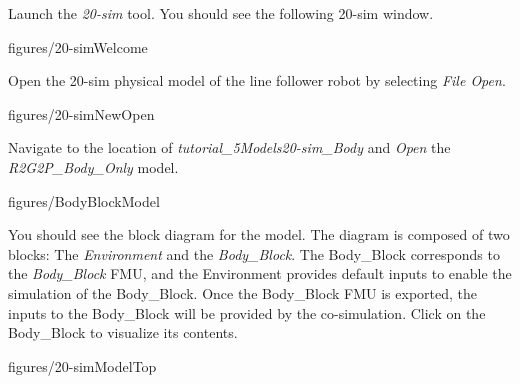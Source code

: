 \documentclass[11pt,a4paper]{../tutorial}
\begin{document}
\begin{instructions}

\item \label{step:exp3} Launch the \emph{20-sim} tool. You should see the following 20-sim window.

    \begin{annotation}[width=0.85\linewidth]{figures/20-simWelcome}
    \end{annotation}


\item Open the 20-sim physical model of the line follower robot by selecting \emph{File \menusep Open}.

     \begin{annotation}[width=0.8\linewidth, trim={0 12cm 0 0},clip]{figures/20-simNewOpen}
    \end{annotation}



\item \label{step:exp4} Navigate to the location of \emph{tutorial\_5\pathsep{}Models\pathsep{}20-sim\_Body} and \emph{Open} the \emph{R2G2P\_Body\_Only} model. 

    \begin{annotation}[width=0.4\linewidth]{figures/BodyBlockModel}
    \end{annotation}

\newpage

\item You should see the block diagram for the model. The diagram is composed of two blocks: The \emph{Environment} and the \emph{Body\_Block}. 
The Body\_Block corresponds to the \emph{Body\_Block} FMU, and the Environment provides default inputs to enable the simulation of the Body\_Block. Once the Body\_Block FMU is exported, the inputs to the Body\_Block will be provided by the co-simulation.
Click on the Body\_Block to visualize its contents.  

    \begin{annotation}[width=0.8\linewidth]{figures/20-simModelTop}
    \end{annotation}

\newpage


\end{instructions}
\end{document}
